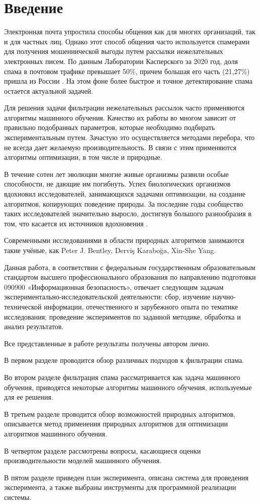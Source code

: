 \chapter*{Введение}

Электронная почта упростила способы общения как для многих организаций, так и для 
частных лиц. Однако этот способ общения часто используется спамерами для получения 
мошеннической выгоды путем рассылки нежелательных электронных писем. \cite{IEEE}
По данным Лаборатории Касперского за 2020 год, доля спама в почтовом трафике превышает 
50\%, причем большая его часть (21,27\%) пришла из России \cite{stat}. На этом фоне 
более быстрое и точное детектирование спама остается актуальной задачей.

Для решения задачи фильтрации нежелательных рассылок часто применяются 
алгоритмы машинного обучения. Качество их работы во многом зависит от правильно 
подобранных параметров, которые необходимо подбирать экспериментальным путем. 
Зачастую это осуществляется методами перебора, что не всегда дает желаемую 
производительность. В связи с этим применяются алгоритмы оптимизации, в том числе 
и природные. 

В течение сотен лет эволюции многие живые организмы развили особые способности, 
не дающие им погибнуть. Успех биологических организмов вдохновил исследователей, 
занимающихся задачами оптимизации, на создание алгоритмов, 
копирующих поведение природы. За последние годы сообщество таких исследователей 
значительно выросло, достигнув большого разнообразия в том, что касается их 
источников вдохновения \cite{BioInspiredTaxonomy}.

Современными исследованиями в области природных алгоритмов занимаются такие учёные, как Peter J. Bentley,
Derviş Karaboğa, Xin-She Yang.

Данная работа, в соответствии с федеральным государственным образовательным стандартом высшего профессионального
образования по направлению подготовки 090900 «Информационная безопасность», отвечает следующим задачам
экспериментально-исследовательской деятельности: сбор, изучение научно-технической информации, отечественного и
зарубежного опыта по тематике исследования; проведение экспериментов по заданной методике, обработка и анализ результатов.

Все представленные в работе результаты получены автором лично.

В первом разделе проводится обзор различных подходов к фильтрации спама.

Во втором разделе фильтрация спама рассматривается как задача машинного обучения, 
приводятся некоторые алгоритмы машинного обучения, используемые для ее решения.

В третьем разделе проводится обзор возможностей природных алгоритмов, описывается 
метод применения природных алгоритмов для оптимизации алгоритмов машинного обучения.

В четвертом разделе рассмотрены вопросы, касающиеся оценки производительности 
моделей машинного обучения. 

В пятом разделе приведен план эксперимента, описана система для проведения эксперимента, 
а также выбраны инструменты для программной реализации системы.